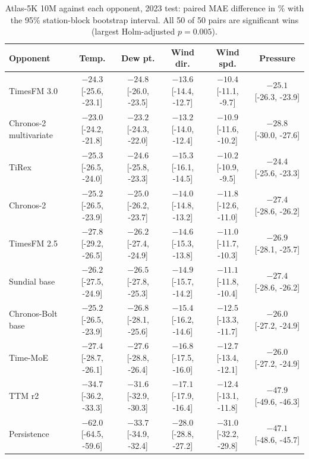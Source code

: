 \begin{table}[H]
\centering\scriptsize
\setlength{\tabcolsep}{2.4pt}
\caption{Atlas-5K 10M against each opponent, 2023 test: paired MAE difference in \% with the 95\% station-block bootstrap interval. All 50 of 50 pairs are significant wins (largest Holm-adjusted $p=0.005$).}
\label{tab:paired_atlas10m_test}
\begin{tabular}{lccccc}
\toprule
Opponent & Temp. & Dew pt. & Wind dir. & Wind spd. & Pressure\\
\midrule
TimesFM 3.0 & $-24.3$ [-25.6, -23.1] & $-24.8$ [-26.0, -23.5] & $-13.6$ [-14.4, -12.7] & $-10.4$ [-11.1, -9.7] & $-25.1$ [-26.3, -23.9]\\
Chronos-2 multivariate & $-23.0$ [-24.2, -21.8] & $-23.2$ [-24.3, -22.0] & $-13.2$ [-14.0, -12.4] & $-10.9$ [-11.6, -10.2] & $-28.8$ [-30.0, -27.6]\\
TiRex & $-25.3$ [-26.5, -24.0] & $-24.6$ [-25.8, -23.3] & $-15.3$ [-16.1, -14.5] & $-10.2$ [-10.9, -9.5] & $-24.4$ [-25.6, -23.3]\\
Chronos-2 & $-25.2$ [-26.5, -23.9] & $-25.0$ [-26.2, -23.7] & $-14.0$ [-14.8, -13.2] & $-11.8$ [-12.6, -11.0] & $-27.4$ [-28.6, -26.2]\\
TimesFM 2.5 & $-27.8$ [-29.2, -26.5] & $-26.2$ [-27.4, -24.9] & $-14.6$ [-15.3, -13.8] & $-11.0$ [-11.7, -10.3] & $-26.9$ [-28.1, -25.7]\\
Sundial base & $-26.2$ [-27.5, -24.9] & $-26.5$ [-27.8, -25.3] & $-14.9$ [-15.7, -14.2] & $-11.1$ [-11.8, -10.4] & $-27.4$ [-28.6, -26.2]\\
Chronos-Bolt base & $-25.2$ [-26.5, -23.9] & $-26.8$ [-28.1, -25.6] & $-15.4$ [-16.2, -14.6] & $-12.5$ [-13.3, -11.7] & $-26.0$ [-27.2, -24.9]\\
Time-MoE & $-27.4$ [-28.7, -26.1] & $-27.6$ [-28.8, -26.4] & $-16.8$ [-17.5, -16.0] & $-12.7$ [-13.4, -12.1] & $-26.0$ [-27.2, -24.9]\\
TTM r2 & $-34.7$ [-36.2, -33.3] & $-31.6$ [-32.9, -30.3] & $-17.1$ [-17.9, -16.4] & $-12.4$ [-13.1, -11.8] & $-47.9$ [-49.6, -46.3]\\
Persistence & $-62.0$ [-64.5, -59.6] & $-33.7$ [-34.9, -32.4] & $-28.0$ [-28.8, -27.2] & $-31.0$ [-32.2, -29.8] & $-47.1$ [-48.6, -45.7]\\
\bottomrule
\end{tabular}
\end{table}
